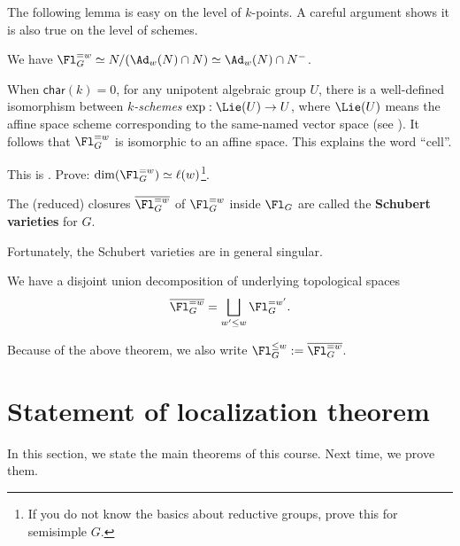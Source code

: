 	The following lemma is easy on the level of $k$-points. A careful argument shows it is also true on the level of schemes.

	\begin{lem}
		We have $\Fl_G^{=w} \simeq N/(\Ad_{w}(N)\cap N) \simeq \Ad_{w}(N)\cap N^-$.
	\end{lem}

	\begin{rem}
		When $\mathsf{char}(k)=0$, for any unipotent algebraic group $U$, there is a well-defined isomorphism between \emph{$k$-schemes} $\exp: \Lie(U) \to U$, where $\Lie(U)$ means the affine space scheme corresponding to the same-named vector space (see \cite[Section 14.d]{M}). It follows that $\Fl_G^{=w}$ is isomorphic to an affine space. This explains the word ``cell''.
	\end{rem}

	\begin{exe}
		This is . Prove: $\dim(\Fl_G^{=w})\simeq \ell(w)$\footnote{If you do not know the basics about reductive groups, prove this for semisimple $G$.}.

	\end{exe}

	\begin{defn}
		The (reduced) closures $\overline{\Fl_G^{=w}}$ of $\Fl_G^{=w}$ inside $\Fl_G$ are called the \textbf{Schubert varieties} for $G$.
	\end{defn}

	\begin{rem}
		Fortunately, the Schubert varieties are in general singular.
	\end{rem}

	\begin{thm}
		We have a disjoint union decomposition of underlying topological spaces
		\[
			\overline{\Fl_G^{=w}} = \bigsqcup_{w'\le w} \Fl_G^{=w'}.
		\]
	\end{thm}

	\begin{notn}
		Because of the above theorem, we also write $\Fl_G^{\le w}:= \overline{\Fl_G^{=w}}$.
	\end{notn}

\section{Statement of localization theorem}
	
	In this section, we state the main theorems of this course. Next time, we prove them.
	
